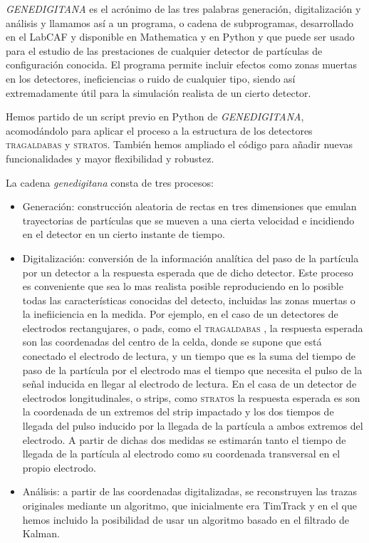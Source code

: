 \documentclass[a4paper]{article}
\begin{document}
\textit{GENEDIGITANA} es el acrónimo de las tres palabras generación, digitalización y análisis y llamamos así a un programa,  o cadena de subprogramas, desarrollado en el LabCAF y disponible en \textsf{Mathematica} y en \textsf{Python} y que puede ser usado para el estudio de las prestaciones de cualquier detector de partículas de configuración conocida. El programa permite incluir efectos como zonas muertas en los detectores, ineficiencias o ruido de cualquier tipo, siendo así extremadamente útil para la simulación realista de un cierto detector. 

Hemos partido de un script previo en \textsf{Python} de \textit{GENEDIGITANA}, acomodándolo para aplicar el proceso a la estructura de los detectores \textsc{tragaldabas} y  \textsc{stratos}. También hemos ampliado el código para añadir nuevas funcionalidades y mayor flexibilidad y robustez.

La cadena \textit{genedigitana} consta de tres procesos:

\begin{itemize}
    \item Generación: construcción aleatoria de rectas en tres dimensiones que emulan trayectorias de partículas que se mueven a una cierta velocidad e incidiendo en el detector en un cierto instante de tiempo.
        
    \item Digitalización: conversión de la información analítica del paso de la partícula por un detector a la respuesta  esperada que de dicho detector. Este proceso es conveniente que sea lo mas realista posible reproduciendo en lo posible todas las características conocidas del detecto, incluidas las zonas muertas o la inefiiciencia en la medida.
    Por ejemplo, en el caso de un detectores de electrodos rectangujares, o pads, como el \textsc{tragaldabas} , la respuesta esperada son las coordenadas del centro de la celda, donde se supone que está conectado el electrodo de lectura, y un tiempo que es la suma del tiempo de paso de la partícula por el electrodo mas el tiempo que necesita el pulso de la señal inducida en llegar al electrodo de lectura. 
    En el casa de un detector de electrodos longitudinales, o strips, como \textsc{stratos} la respuesta esperada es son la coordenada de un extremos del strip impactado y los  dos tiempos de llegada del pulso inducido por la llegada de la partícula a ambos extremos del electrodo. A partir de dichas dos medidas se estimarán tanto el tiempo de llegada de la partícula al electrodo como su coordenada transversal en el propio electrodo. 
    
    \item Análisis: a partir de las coordenadas digitalizadas, se reconstruyen las trazas originales mediante un algoritmo, que inicialmente era TimTrack y en el que hemos incluido la posibilidad de usar un algoritmo basado en el filtrado de Kalman.
\end{itemize}
\end{document}
